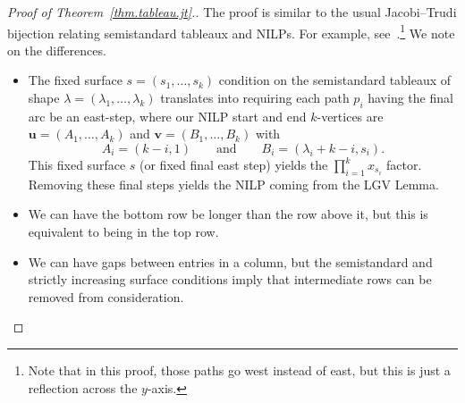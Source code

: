 \documentclass[reqno]{amsart}
\newcommand{\0}{\phantom{c}}
\newcommand{\uu}{\mathbf{u}}
\newcommand{\vv}{\mathbf{v}}
\let\prodnonlimits\prod
\renewcommand{\prod}{\prodnonlimits\limits}
\newenvironment{vershort}{}{}
\theoremstyle{plain}
\theoremstyle{definition}
\numberwithin{equation}{section}
\begin{document}
\begin{vershort}
\begin{proof}[Proof of Theorem~\ref{thm.tableau.jt}.]
The proof is similar to the usual Jacobi--Trudi bijection relating semistandard tableaux and NILPs.
For example, see~\cite[First proof of Thm. 7.16.1]{Stanley-EC2}.\footnote{Note that in this proof, those paths go west instead of east, but this is just a reflection across the $y$-axis.}
We note on the differences.
\begin{itemize}
\item The fixed surface $s = (s_1, \dotsc, s_k)$ condition on the semistandard tableaux of shape $\lambda = (\lambda_1, \dotsc, \lambda_k)$ translates into requiring each path $p_i$ having the final arc be an east-step, where our NILP start and end $k$-vertices are $\uu = (A_1, \dotsc, A_k)$ and $\vv = (B_1, \dotsc, B_k)$ with
\[
A_i = (k-i,1)  \qquad \text{and} \qquad B_i = (\lambda_i+k-i, s_i).
\]
This fixed surface $s$ (or fixed final east step) yields the $\prod_{i=1}^k x_{s_i}$ factor.
Removing these final steps yields the NILP coming from the LGV Lemma.
\item We can have the bottom row be longer than the row above it, but this is equivalent to being in the top row.
\item We can have gaps between entries in a column, but the semistandard and strictly increasing surface conditions imply that intermediate rows can be removed from consideration.
\end{itemize}
\end{proof}
\end{vershort}
\end{document}
